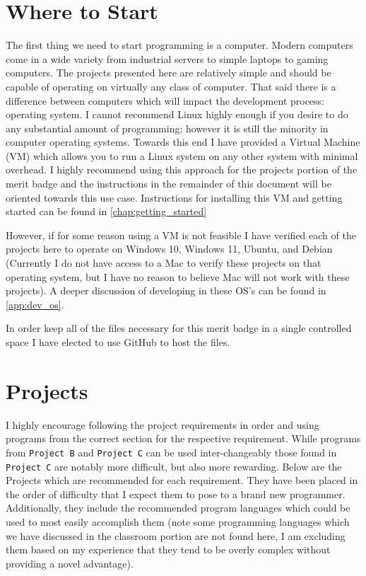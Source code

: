   \section{Where to Start}
  \label{sec:where_to_start}

    The first thing we need to start programming is a computer.
    Modern computers come in a wide variety from industrial servers to simple laptops to gaming computers.
    The projects presented here are relatively simple and should be capable of operating on virtually
      any class of computer.
    That said there is a difference between computers which will impact the development process: operating system.
    I cannot recommend Linux highly enough if you desire to do any substantial amount of programming;
      however it is still the minority in computer operating systems.
    Towards this end I have provided a Virtual Machine (VM) which allows you to run a Linux system on any other system
      with minimal overhead.
    I highly recommend using this approach for the projects portion of the merit badge and the instructions in the 
      remainder of this document will be oriented towards this use case.
    Instructions for installing this VM and getting started can be found in \autoref{chap:getting_started}

    However, if for some reason using a VM is not feasible I have verified each of the projects here to operate on 
      Windows 10, Windows 11, Ubuntu, and Debian (Currently I do not have access to a Mac to verify these projects 
      on that operating system, but I have no reason to believe Mac will not work with these projects).
    A deeper discussion of developing in these OS's can be found in \autoref{app:dev_os}.

    In order keep all of the files necessary for this merit badge in a single controlled space
      I have elected to use GitHub to host the files.


  \section{Projects}
  \label{sec:projects}

    I highly encourage following the project requirements in order and using programs from the correct section
      for the respective requirement.
    While programs from \texttt{Project B} and \texttt{Project C} can be used inter-changeably those found in 
      \texttt{Project C} are notably more difficult, but also more rewarding.
    Below are the Projects which are recommended for each requirement.
    They have been placed in the order of difficulty that I expect them to pose to a brand new programmer.
    Additionally, they include the recommended program languages which could be used to most easily accomplish them
      (note some programming languages which we have discussed in the classroom portion are not found here, 
      I am excluding them based on my experience that they tend to be overly complex without providing a novel advantage).


